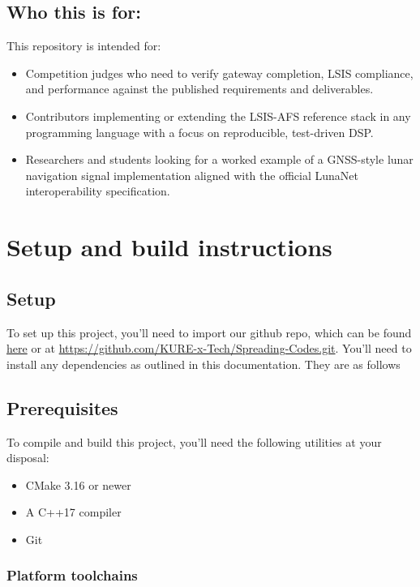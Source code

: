 \documentclass{article}
\begin{document}
\subsection*{Who this is for:}

This repository is intended for: 
\begin{itemize}
    \item Competition judges who need to verify gateway completion, LSIS compliance, and performance against the published requirements and deliverables.
    \item Contributors implementing or extending the LSIS-AFS reference stack in any programming language with a focus on reproducible, test-driven DSP.
    \item Researchers and students looking for a worked example of a GNSS-style lunar navigation signal implementation aligned with the official LunaNet interoperability specification.
\end{itemize}

\newpage

\section{Setup and build instructions}

\subsection*{Setup}

To set up this project, you'll need to import our github repo, which can be found \href{https://github.com/KURE-x-Tech/Spreading-Codes.git}{here} or at \url{https://github.com/KURE-x-Tech/Spreading-Codes.git}.
You'll need to install any dependencies as outlined in this documentation. They are as follows

\subsection*{Prerequisites}

To compile and build this project, you'll need the following utilities at your disposal: 
\begin{itemize}
    \item CMake 3.16 or newer
    \item A C++17 compiler
    \item Git
\end{itemize}

\subsubsection*{Platform toolchains}
\end{document}
